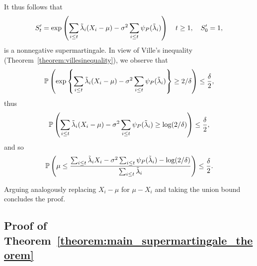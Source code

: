 It thus follows that 
\begin{align*}
    S_t' = \exp \left( \sum_{i \leq t} \tilde\lambda_i (X_i - \mu) - \sigma^2\sum_{i \leq t} \psi_P(\tilde\lambda_i)\right) \quad t \geq 1, \quad S_0' = 1,
\end{align*}
is a nonnegative supermartingale. In view of Ville's inequality (Theorem~\ref{theorem:villesinequality}), we observe that
\begin{align*}
    \mathbb{P} \left( \exp\left\{\sum_{i \leq t} \tilde\lambda_i (X_i - \mu) - \sigma^2\sum_{i \leq t} \psi_P(\tilde\lambda_i)\right\} \geq 2/\delta \right) \leq \frac{\delta}{2},
\end{align*}
thus
\begin{align*}
    \mathbb{P} \left( \sum_{i \leq t} \tilde\lambda_i (X_i - \mu) - \sigma^2\sum_{i \leq t} \psi_P(\tilde\lambda_i) \geq \log (2/\delta) \right) \leq \frac{\delta}{2},
\end{align*}
and so 
\begin{align*}
    \mathbb{P} \left( \mu \leq \frac{\sum_{i \leq t} \tilde\lambda_i X_i - \sigma^2\sum_{i \leq t} \psi_P(\tilde\lambda_i) - \log (2/\delta)}{\sum_{i \leq t} \tilde\lambda_i} \right) \leq \frac{\delta}{2}.
\end{align*}

Arguing analogously replacing $X_i - \mu$ for $\mu - X_i$ and taking the union bound concludes the proof.


\subsection{Proof of Theorem~\ref{theorem:main_supermartingale_theorem}} \label{proof:main_supermartingale_theorem}


